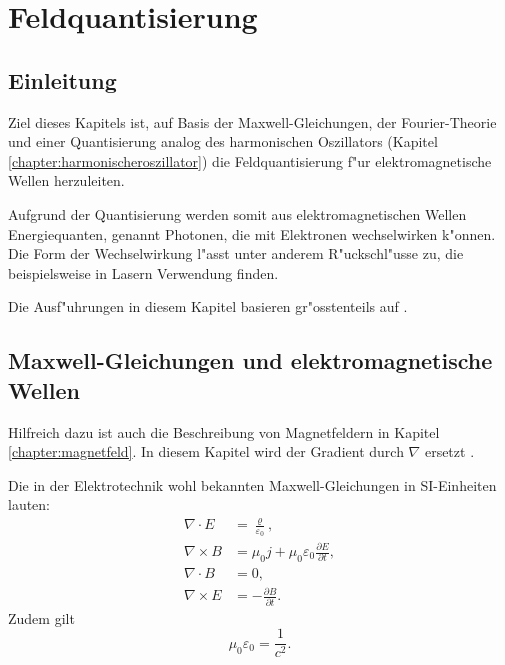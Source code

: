\chapter{Feldquantisierung\label{chapter:feldquantisierung}}
\begin{refsection}

\renewcommand{\sectionmark}[1]{\markboth{}{~#1}}
\fancyhead[R]{\nouppercase{\rightmark}}

\section{Einleitung}

Ziel dieses Kapitels ist, auf Basis der Maxwell-Gleichungen, der Fourier-Theorie und einer Quantisierung analog des harmonischen Oszillators (Kapitel \ref{chapter:harmonischeroszillator}) die Feldquantisierung f"ur elektromagnetische Wellen herzuleiten.

Aufgrund der Quantisierung werden somit aus elektromagnetischen Wellen Energiequanten, genannt Photonen, die mit Elektronen wechselwirken k"onnen. Die Form der Wechselwirkung l"asst unter anderem R"uckschl"usse zu, die beispielsweise in Lasern Verwendung finden.

Die Ausf"uhrungen in diesem Kapitel basieren gr"osstenteils auf \cite{fq:aqm}.

\section{Maxwell-Gleichungen und elektromagnetische Wellen}

Hilfreich dazu ist auch die Beschreibung von Magnetfeldern in Kapitel \ref{chapter:magnetfeld}. In diesem Kapitel wird der Gradient durch $\nabla$ ersetzt \cite{fq:nabla}.

Die in der Elektrotechnik wohl bekannten Maxwell-Gleichungen in SI-Einheiten lauten:
\begin{align}
\nabla\cdot E &= \frac{\varrho}{\varepsilon_0} \label{fq:maxwell_1},\\
\nabla\times B &= \mu_0 j  + \mu_0 \varepsilon_0\frac{\partial E}{\partial t} \label{fq:maxwell_2},\\
\nabla\cdot B &=0 \label{fq:maxwell_3},\\
\nabla\times E &= -\frac{\partial B }{\partial t} \label{fq:maxwell_4}.
\end{align}
Zudem gilt
\begin{equation*}
\mu_0\varepsilon_0=\frac{1}{c^2}.
\end{equation*}


\end{refsection}
